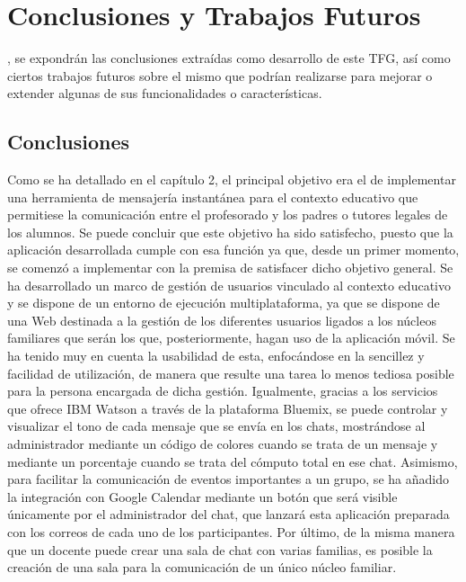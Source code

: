 \chapter{Conclusiones y Trabajos Futuros}
\label{chap:conclusiones}

, se expondrán las conclusiones extraídas como desarrollo de este \acs{TFG}, así como ciertos trabajos futuros sobre el mismo que podrían realizarse para mejorar o extender algunas de sus funcionalidades o características.

\section{Conclusiones}
Como se ha detallado en el capítulo 2, el principal objetivo era el de implementar una herramienta de mensajería instantánea para el contexto educativo que permitiese la comunicación entre el profesorado y los padres o tutores legales de los alumnos. Se puede concluir que este objetivo ha sido satisfecho, puesto que la aplicación desarrollada cumple con esa función ya que, desde un primer momento, se comenzó a implementar con la premisa de satisfacer dicho objetivo general. Se ha desarrollado un marco de gestión de usuarios vinculado al contexto educativo y se dispone de un entorno de ejecución multiplataforma, ya que se dispone de una Web destinada a la gestión de los diferentes usuarios ligados a los núcleos familiares que serán los que, posteriormente, hagan uso de la aplicación móvil. Se ha tenido muy en cuenta la usabilidad de esta, enfocándose en la sencillez y facilidad de utilización, de manera que resulte una tarea lo menos tediosa posible para la persona encargada de dicha gestión. Igualmente, gracias a los servicios que ofrece IBM Watson a través de la plataforma Bluemix, se puede controlar y visualizar el tono de cada mensaje que se envía en los chats, mostrándose al administrador mediante un código de colores cuando se trata de un mensaje y mediante un porcentaje cuando se trata del cómputo total en ese chat. Asimismo, para facilitar la comunicación de eventos importantes a un grupo, se ha añadido la integración con Google Calendar mediante un botón que será visible únicamente por el administrador del chat, que lanzará esta aplicación preparada con los correos de cada uno de los participantes. Por último, de la misma manera que un docente puede crear una sala de chat con varias familias, es posible la creación de una sala para la comunicación de un único núcleo familiar.

\clearpage

